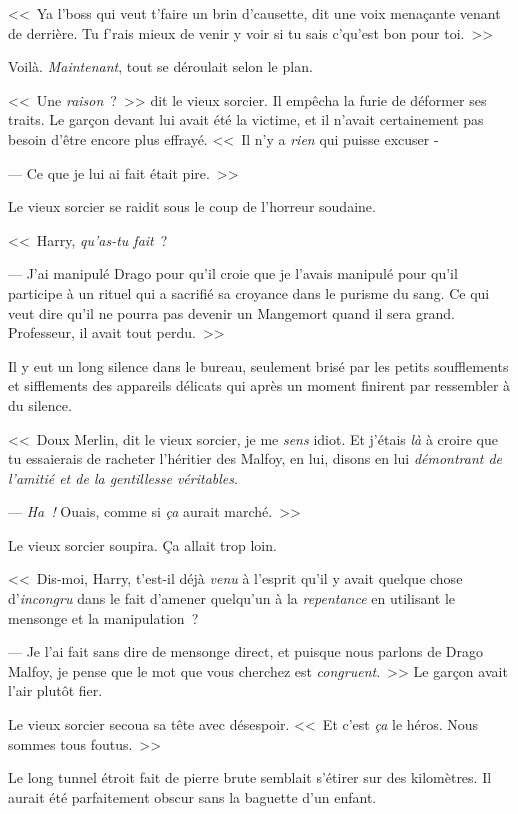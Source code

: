 <<~Ya l'boss qui veut t'faire un brin d'causette, dit une voix menaçante venant de derrière. Tu f'rais mieux de venir y voir si tu sais c'qu'est bon pour toi.~>>

Voilà. \emph{Maintenant}, tout se déroulait selon le plan.


<<~Une \emph{raison}~?~>> dit le vieux sorcier. Il empêcha la furie de déformer ses traits. Le garçon devant lui avait été la victime, et il n'avait certainement pas besoin d'être encore plus effrayé. <<~Il n'y a \emph{rien} qui puisse excuser -

--- Ce que je lui ai fait était pire.~>>

Le vieux sorcier se raidit sous le coup de l'horreur soudaine.

<<~Harry, \emph{qu'as-tu fait}~?

--- J'ai manipulé Drago pour qu'il croie que je l'avais manipulé pour qu'il participe à un rituel qui a sacrifié sa croyance dans le purisme du sang. Ce qui veut dire qu'il ne pourra pas devenir un Mangemort quand il sera grand. Professeur, il avait tout perdu.~>>

Il y eut un long silence dans le bureau, seulement brisé par les petits soufflements et sifflements des appareils délicats qui après un moment finirent par ressembler à du silence.

<<~Doux Merlin, dit le vieux sorcier, je me \emph{sens} idiot. Et j'étais \emph{là} à croire que tu essaierais de racheter l'héritier des Malfoy, en lui, disons en lui \emph{démontrant de l'amitié et de la gentillesse véritables}.

--- \emph{Ha~!} Ouais, comme si \emph{ça} aurait marché.~>>

Le vieux sorcier soupira. Ça allait trop loin.

<<~Dis-moi, Harry, t'est-il déjà \emph{venu} à l'esprit qu'il y avait quelque chose d'\emph{incongru} dans le fait d'amener quelqu'un à la \emph{repentance} en utilisant le mensonge et la manipulation~?

--- Je l'ai fait sans dire de mensonge direct, et puisque nous parlons de Drago Malfoy, je pense que le mot que vous cherchez est \emph{congruent}.~>> Le garçon avait l'air plutôt fier.

Le vieux sorcier secoua sa tête avec désespoir. <<~Et c'est \emph{ça} le héros. Nous sommes tous foutus.~>>


Le long tunnel étroit fait de pierre brute semblait s'étirer sur des kilomètres. Il aurait été parfaitement obscur sans la baguette d'un enfant.

